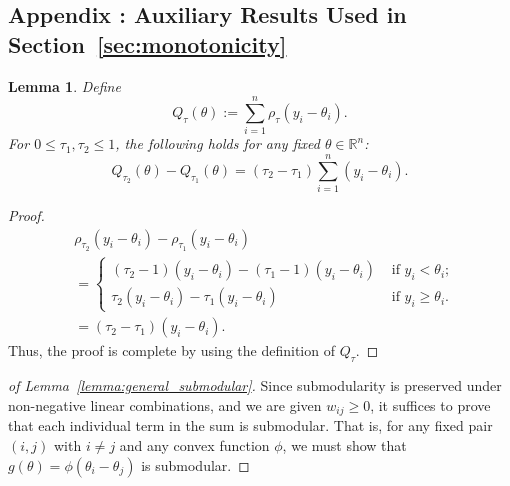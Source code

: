 \documentclass[11pt]{article}
\newcommand{\bR}{\mathbb{R}}
\theoremstyle{plain}
\newtheorem{lemma}[theorem]{Lemma}
\theoremstyle{definition}
\theoremstyle{remark}
\begin{document}
\begin{appendix}
\section*{Appendix \thesection: Auxiliary Results Used in Section~\ref{sec:monotonicity}}\label{appnb}
\begin{lemma}\label{lem:qtl_linearity}
Define
\[Q_{\tau}(\theta):=\sum_{i=1}^{n}\rho_{\tau}(y_i-\theta_i).\]
    For $0\leq\tau_1,\tau_2\leq 1$, the following holds for any fixed $\theta \in \bR^n$:
    \[Q_{\tau_2}(\theta)-Q_{\tau_1}(\theta)=(\tau_2-\tau_1)\sum_{i=1}^n (y_i-\theta_i).\]
\end{lemma}
\begin{proof}
    \begin{align*}
        &\rho_{\tau_2}(y_i-\theta_i)-\rho_{\tau_1}(y_i-\theta_i)\\
        &=\begin{cases}
            (\tau_2-1)(y_i-\theta_i)-(\tau_1-1)(y_i-\theta_i) & \text{ if }y_i<\theta_i;\\
            \tau_2(y_i-\theta_i)-\tau_1(y_i-\theta_i) & \text{ if }y_i\geq\theta_i.
        \end{cases}\\
        &=(\tau_2-\tau_1)(y_i-\theta_i).
    \end{align*}
    Thus, the proof is complete by using the definition of $Q_{\tau}.$
\end{proof}
\begin{proof}[of Lemma~\ref{lemma:general_submodular}]
   Since submodularity is preserved under non-negative linear combinations, and we are given $w_{ij} \geq 0$, it suffices to prove that each individual term in the sum is submodular. That is, for any fixed pair $(i,j)$ with $i \neq j$ and any convex function $\phi$, we must show that $g(\theta) = \phi(\theta_i - \theta_j)$ is submodular. 


\end{proof}
\end{appendix}
\end{document}
